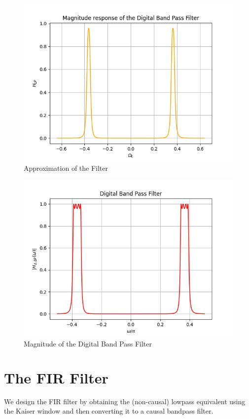 \documentclass[journal,12pt,twocolumn]{IEEEtran}
\theoremstyle{remark}
\begin{document}
\begin{figure}
    \centering
    \includegraphics[width = \columnwidth]{figs/digital_bp.png}
    \caption{Approximation of the Filter}
    \label{fig:approx}
\end{figure}
\begin{figure}
    \centering
    \includegraphics[width = \columnwidth]{figs/Digital_BPF.png}
    \caption{ Magnitude of the Digital Band Pass Filter}
    \label{fig:d,BP}
\end{figure}
\section{The FIR Filter}
We design the FIR filter by obtaining the (non-causal) lowpass equivalent using the Kaiser window and then converting it to a causal bandpass filter.
\end{document}
